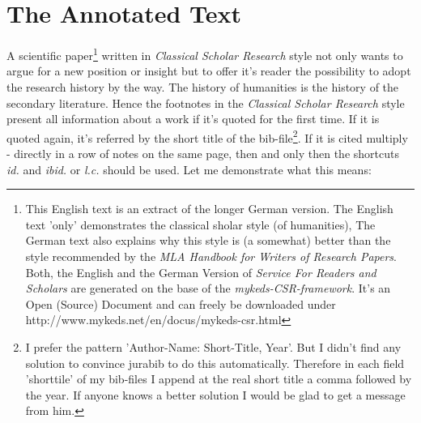 %
%
%
%
%

\section{The Annotated Text}

A scientific paper\footnote{This English text is an extract of the longer
German version. The English text 'only' demonstrates the
classical sholar style (of humanities), The German text also explains why
this style is (a somewhat) better than the style recommended by the \textit{MLA
Handbook for Writers of Research Papers}. Both, the English and the German Version of \textit{Service For Readers and Scholars} are
generated on the base of the \textit{mykeds-CSR-framework}. It's an Open
(Source) Document and can freely be downloaded under
http://www.mykeds.net/en/docus/mykeds-csr.html} written in \textit{Classical Scholar Research} style not only wants to argue for a new position or insight
but to offer it's reader the possibility to adopt the research history by the
way. The history of humanities is the history of the secondary literature. Hence
the footnotes in the \textit{Classical Scholar Research} style present all
information about a work if it's quoted for the first time. If it is quoted
again, it's referred by the short title of the bib-file\footnote{I prefer the
pattern 'Author-Name: Short-Title, Year'. But I didn't find any solution to
convince jurabib to do this automatically. Therefore in each field 'shorttile'
of my bib-files I append at the real short title a comma followed by the year. If
anyone knows a better solution I would be glad to get a message from him.}. If
it is cited multiply - directly in a row of notes on the same page, then and
only then the shortcuts \textit{id.} and \textit{ibid.} or \textit{l.c.} should
be used. Let me demonstrate what this means:

